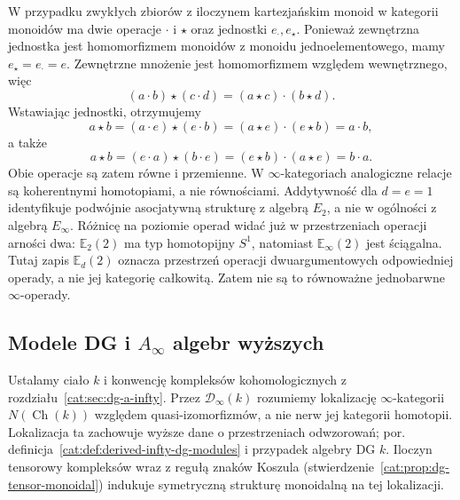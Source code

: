 \begin{przyklad}\label{cat:ex:infty-eckmann-hilton}
W przypadku zwykłych zbiorów z iloczynem kartezjańskim monoid w kategorii monoidów ma dwie operacje $\cdot$ i $\star$ oraz jednostki $e_\cdot,e_\star$. Ponieważ zewnętrzna jednostka jest homomorfizmem monoidów z monoidu jednoelementowego, mamy $e_\star=e_\cdot=e$. Zewnętrzne mnożenie jest homomorfizmem względem wewnętrznego, więc
\[
 (a\cdot b)\star(c\cdot d)=(a\star c)\cdot(b\star d).
\]
Wstawiając jednostki, otrzymujemy
\[
 a\star b=(a\cdot e)\star(e\cdot b)
 =(a\star e)\cdot(e\star b)=a\cdot b,
\]
a także
\[
 a\star b=(e\cdot a)\star(b\cdot e)
 =(e\star b)\cdot(a\star e)=b\cdot a.
\]
Obie operacje są zatem równe i przemienne. W $\infty$-kategoriach analogiczne relacje są koherentnymi homotopiami, a nie równościami. Addytywność dla $d=e=1$ identyfikuje podwójnie asocjatywną strukturę z algebrą $E_2$, a nie w ogólności z algebrą $E_\infty$. Różnicę na poziomie operad widać już w przestrzeniach operacji arności dwa: $\mathbb E_2(2)$ ma typ homotopijny $S^1$, natomiast $\mathbb E_\infty(2)$ jest ściągalna. Tutaj zapis $\mathbb E_d(2)$ oznacza przestrzeń operacji dwuargumentowych odpowiedniej operady, a nie jej kategorię całkowitą. Zatem nie są to równoważne jednobarwne $\infty$-operady.
\end{przyklad}

\subsection{Modele DG i \texorpdfstring{$A_\infty$}{A-infty} algebr wyższych}

Ustalamy ciało $k$ i konwencję kompleksów kohomologicznych z rozdziału~\ref{cat:sec:dg-a-infty}. Przez $\mathcal D_\infty(k)$ rozumiemy lokalizację $\infty$-kategorii $N(\operatorname{Ch}(k))$ względem quasi-izomorfizmów, a nie nerw jej kategorii homotopii. Lokalizacja ta zachowuje wyższe dane o przestrzeniach odwzorowań; por. definicja~\ref{cat:def:derived-infty-dg-modules} i przypadek algebry DG $k$. Iloczyn tensorowy kompleksów wraz z regułą znaków Koszula (stwierdzenie~\ref{cat:prop:dg-tensor-monoidal}) indukuje symetryczną strukturę monoidalną na tej lokalizacji.

